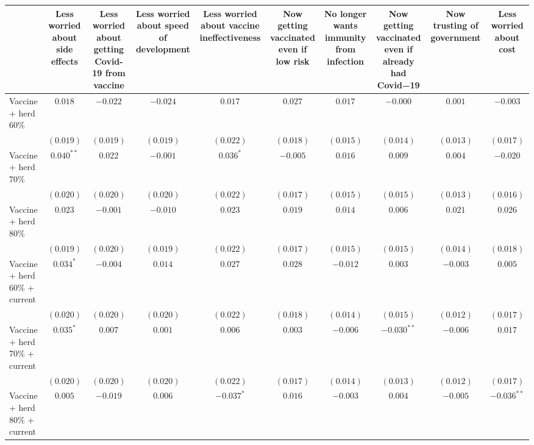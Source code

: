\begin{table}
\begin{center}
\begin{tabular}{l c c c c c c c c c}
\hline
 & Less worried about side effects & Less worried about getting Covid-19 from vaccine & Less worried about speed of development & Less worried about vaccine ineffectiveness & Now getting vaccinated even if low risk & No longer wants immunity from infection & Now getting vaccinated even if already had Covid−19 & Now trusting of government & Less worried about cost \\
\hline
Vaccine + herd 60\%           & $0.018$      & $-0.022$  & $-0.024$  & $0.017$      & $0.027$   & $0.017$   & $-0.000$      & $0.001$   & $-0.003$      \\
                              & $(0.019)$    & $(0.019)$ & $(0.019)$ & $(0.022)$    & $(0.018)$ & $(0.015)$ & $(0.014)$     & $(0.013)$ & $(0.017)$     \\
Vaccine + herd 70\%           & $0.040^{**}$ & $0.022$   & $-0.001$  & $0.036^{*}$  & $-0.005$  & $0.016$   & $0.009$       & $0.004$   & $-0.020$      \\
                              & $(0.020)$    & $(0.020)$ & $(0.020)$ & $(0.022)$    & $(0.017)$ & $(0.015)$ & $(0.015)$     & $(0.013)$ & $(0.016)$     \\
Vaccine + herd 80\%           & $0.023$      & $-0.001$  & $-0.010$  & $0.023$      & $0.019$   & $0.014$   & $0.006$       & $0.021$   & $0.026$       \\
                              & $(0.019)$    & $(0.020)$ & $(0.019)$ & $(0.022)$    & $(0.017)$ & $(0.015)$ & $(0.015)$     & $(0.014)$ & $(0.018)$     \\
Vaccine + herd 60\% + current & $0.034^{*}$  & $-0.004$  & $0.014$   & $0.027$      & $0.028$   & $-0.012$  & $0.003$       & $-0.003$  & $0.005$       \\
                              & $(0.020)$    & $(0.020)$ & $(0.020)$ & $(0.022)$    & $(0.018)$ & $(0.014)$ & $(0.015)$     & $(0.012)$ & $(0.017)$     \\
Vaccine + herd 70\% + current & $0.035^{*}$  & $0.007$   & $0.001$   & $0.006$      & $0.003$   & $-0.006$  & $-0.030^{**}$ & $-0.006$  & $0.017$       \\
                              & $(0.020)$    & $(0.020)$ & $(0.020)$ & $(0.022)$    & $(0.017)$ & $(0.014)$ & $(0.013)$     & $(0.012)$ & $(0.017)$     \\
Vaccine + herd 80\% + current & $0.005$      & $-0.019$  & $0.006$   & $-0.037^{*}$ & $0.016$   & $-0.003$  & $0.004$       & $-0.005$  & $-0.036^{**}$ \\

\end{tabular}
\end{center}
\end{table}
